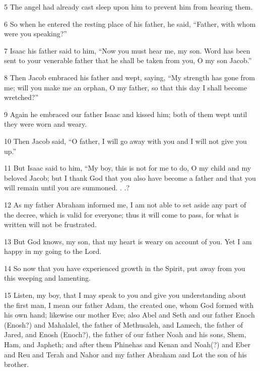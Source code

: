 \par 5 The angel had already cast sleep upon him to prevent him from hearing them. 

\par 6 So when he entered the resting place of his father, he said, “Father, with whom were you speaking?” 

\par 7 Isaac his father said to him, “Now you must hear me, my son. Word has been sent to your venerable father that he shall be taken from you, O my son Jacob.” 

\par 8 Then Jacob embraced his father and wept, saying, “My strength has gone from me; will you make me an orphan, O my father, so that this day I shall become wretched?” 

\par 9 Again he embraced our father Isaac and kissed him; both of them wept until they were worn and weary. 

\par 10 Then Jacob said, “O father, I will go away with you and I will not give you up.” 

\par 11 But Isaac said to him, “My boy, this is not for me to do, O my child and my beloved Jacob; but I thank God that you also have become a father and that you will remain until you are summoned. . .? 

\par 12 As my father Abraham informed me, I am not able to set aside any part of the decree, which is valid for everyone; thus it will come to pass, for what is written will not be frustrated. 

\par 13 But God knows, my son, that my heart is weary on account of you. Yet I am happy in my going to the Lord. 

\par 14 So now that you have experienced growth in the Spirit, put away from you this weeping and lamenting. 

\par 15 Listen, my boy, that I may speak to you and give you understanding about the first man, I mean our father Adam, the created one, whom God formed with his own hand; likewise our mother Eve; also Abel and Seth and our father Enoch (Enosh?) and Mahalalel, the father of Methusaleh, and Lamech, the father of Jared, and Enosh (Enoch?), the father of our father Noah and his sons, Shem, Ham, and Japheth; and after them Phinehas and Kenan and Noah(?) and Eber and Reu and Terah and Nahor and my father Abraham and Lot the son of his brother.

